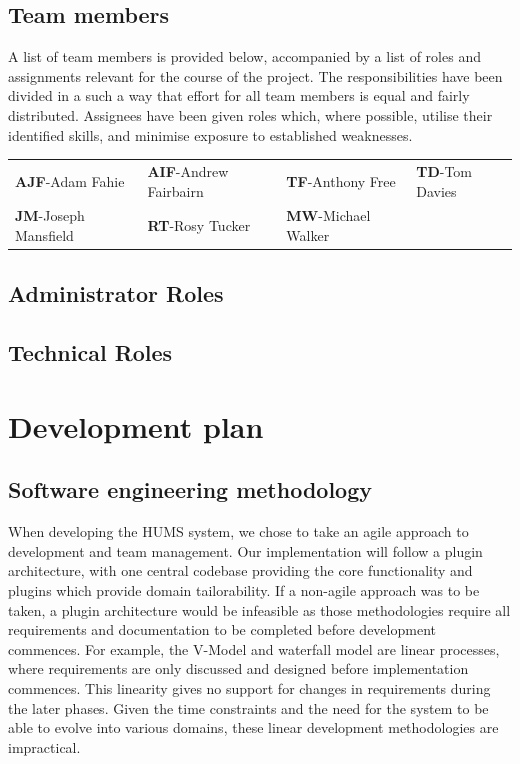 \documentclass[10pt,a4paper]{article}
\begin{document}
\subsection{Team members}
A list of team members is provided below, accompanied by a list of roles and
assignments relevant for the course of the project. The responsibilities have
been divided in a such a way that effort for all team members is equal and
fairly distributed. Assignees have been given roles which, where possible,
utilise their identified skills, and minimise exposure to established
weaknesses.

\begin{tabular}{ p{4cm} p{4cm} p{4cm} p{4cm} }
	\textbf{AJF}-Adam Fahie & \textbf{AIF}-Andrew Fairbairn &
			\textbf{TF}-Anthony Free & \textbf{TD}-Tom Davies \\
	\textbf{JM}-Joseph Mansfield & \textbf{RT}-Rosy Tucker &
			\textbf{MW}-Michael Walker & \\
\end{tabular}
\subsection{Administrator Roles} 


\subsection{Technical Roles}



\section{Development plan}

\subsection{Software engineering methodology}
When developing the HUMS system, we chose to take an agile approach to
development and team management. Our implementation will follow a plugin
architecture, with one central codebase providing the core functionality and
plugins which provide domain tailorability. If a non-agile approach was to be
taken, a plugin architecture would be infeasible as those methodologies require
all requirements and documentation to be completed before development commences.
For example, the V-Model and waterfall model are linear processes, where
requirements are only discussed and designed before implementation commences.
This linearity gives no support for changes in requirements during the later
phases. Given the time constraints and the need for the system to be able to
evolve into various domains, these linear development methodologies are
impractical.
\end{document}
